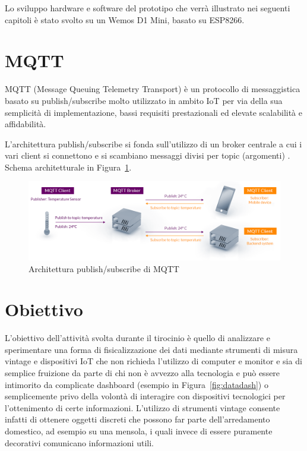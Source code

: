 \documentclass[12pt,a4paper]{report}
\begin{document}
Lo sviluppo hardware e software del prototipo che verrà illustrato nei seguenti capitoli è stato svolto su un Wemos D1 Mini, basato
su ESP8266.

\section{MQTT}
MQTT (Message Queuing Telemetry Transport) è un protocollo di messaggistica basato su publish/subscribe molto utilizzato in ambito
IoT per via della sua semplicità di implementazione, bassi requisiti prestazionali ed elevate scalabilità e affidabilità. 

L'architettura publish/subscribe si fonda sull'utilizzo di un broker centrale a cui i vari client si connettono e si scambiano messaggi
divisi per topic (argomenti) \cite{mqttorg}. Schema architetturale in Figura~\ref{fig:mqttarch}.

\begin{figure}[h]
  \centering
  \includegraphics[width=\textwidth]{mqttarch}
  \caption{Architettura publish/subscribe di MQTT \cite{mqttorg}}
  \label{fig:mqttarch}
\end{figure}

\section{Obiettivo}
L'obiettivo dell'attività svolta durante il tirocinio è quello di analizzare e sperimentare una forma di fisicalizzazione
dei dati mediante strumenti di misura vintage e dispositivi IoT che non richieda l'utilizzo di computer e monitor e sia di semplice fruizione
da parte di chi non è avvezzo alla tecnologia e può essere intimorito da complicate dashboard (esempio in Figura~\ref{fig:datadash})
o semplicemente privo della volontà di interagire con dispositivi tecnologici per l'ottenimento di certe informazioni.
L'utilizzo di strumenti vintage consente infatti di ottenere oggetti discreti che possono far parte dell'arredamento domestico,
ad esempio su una mensola, i quali invece di essere puramente decorativi comunicano informazioni utili.
\end{document}
